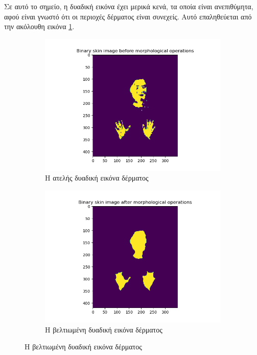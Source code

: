 \documentclass{article}
\begin{document}
Σε αυτό το σημείο, η δυαδική εικόνα έχει μερικά κενά, τα οποία είναι ανεπιθύμητα, αφού είναι γνωστό ότι οι περιοχές δέρματος είναι συνεχείς. Αυτό επαληθεύεται από την ακόλουθη εικόνα \ref{fig:binary-skin-bad}.

\begin{figure}[h]
    \centering
    \begin{subfigure}[b]{0.49\textwidth}
        \centering
        \includegraphics[width=\textwidth]{../part1/results/binary_skin_image.png}
        \caption{Η ατελής δυαδική εικόνα δέρματος}
        \label{fig:binary-skin-bad}
    \end{subfigure}
    \hfill
    \begin{subfigure}[b]{0.49\textwidth}
        \centering
        \includegraphics[width=\textwidth]{../part1/results/binary_skin_image_better.png}
        \caption{Η βελτιωμένη δυαδική εικόνα δέρματος}
        \label{fig:binary-skin-good}
    \end{subfigure}
\end{figure}
\end{document}
